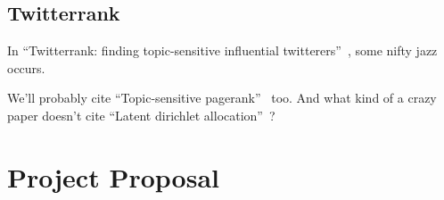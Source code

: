 \documentclass[11pt]{article}
\newcommand{\titlecite}[2]{``#1''~\cite{#2}}
\begin{document}
\subsection{Twitterrank}
In \titlecite{Twitterrank: finding topic-sensitive influential twitterers}{weng2010twitterrank}, 
some nifty jazz occurs.

We'll probably cite \titlecite{Topic-sensitive pagerank}{haveliwala2002topic} too. And what kind of a crazy
paper doesn't cite \titlecite{Latent dirichlet allocation}{blei2003latent}?

\section{Project Proposal}
{} 
\end{document}
